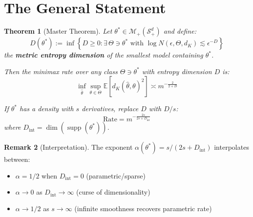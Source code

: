 \documentclass[11pt]{article}
\newtheorem{theorem}{Theorem}[section]
\theoremstyle{definition}
\newtheorem{remark}[theorem]{Remark}
\DeclareMathOperator{\supp}{supp}
\newcommand{\E}{\mathbb{E}}
\newcommand{\Splus}{\mathcal{S}_+^d}
\newcommand{\M}{\mathcal{M}}
\begin{document}
\section{The General Statement}

\begin{tcolorbox}[colback=red!5!white, colframe=red!50!black, title=Most General Form]
\begin{theorem}[Master Theorem]
\label{thm:master}
Let $\theta^* \in \M_+(\Splus)$ and define:
\begin{equation}
    D(\theta^*) := \inf\left\{D \geq 0 : \exists \, \Theta \ni \theta^* \text{ with } \log N(\epsilon, \Theta, d_K) \lesssim \epsilon^{-D}\right\}
\end{equation}
the \textbf{metric entropy dimension} of the smallest model containing $\theta^*$.

Then the minimax rate over any class $\Theta \ni \theta^*$ with entropy dimension $D$ is:
\begin{equation}
    \boxed{
    \inf_{\hat{\theta}} \sup_{\theta \in \Theta} \E\left[d_K(\hat{\theta}, \theta)^2\right] \asymp m^{-\frac{2}{2 + D}}
    }
\end{equation}

If $\theta^*$ has a density with $s$ derivatives, replace $D$ with $D/s$:
\begin{equation}
    \boxed{
    \text{Rate} = m^{-\frac{2s}{2s + D_{\mathrm{int}}}}
    }
\end{equation}
where $D_{\mathrm{int}} = \dim(\supp(\theta^*))$.
\end{theorem}
\end{tcolorbox}

\begin{remark}[Interpretation]
The exponent $\alpha(\theta^*) = s/(2s + D_{\mathrm{int}})$ interpolates between:
\begin{itemize}
    \item $\alpha = 1/2$ when $D_{\mathrm{int}} = 0$ (parametric/sparse)
    \item $\alpha \to 0$ as $D_{\mathrm{int}} \to \infty$ (curse of dimensionality)
    \item $\alpha \to 1/2$ as $s \to \infty$ (infinite smoothness recovers parametric rate)
\end{itemize}
\end{remark}
\end{document}
